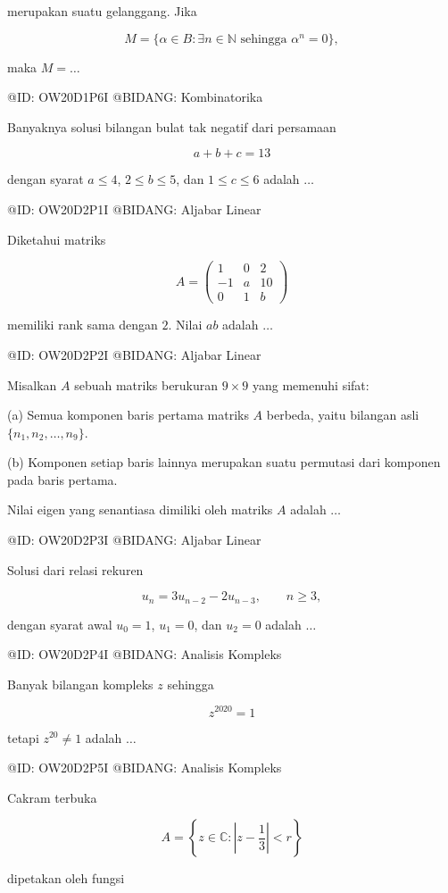 merupakan suatu gelanggang. Jika

$$
M=\{\alpha\in B:\exists n\in\mathbb N\text{ sehingga }\alpha^n=0\},
$$

maka $M=\ldots$

@ID: OW20D1P6I
@BIDANG: Kombinatorika

Banyaknya solusi bilangan bulat tak negatif dari persamaan

$$
a+b+c=13
$$

dengan syarat $a\le4$, $2\le b\le5$, dan $1\le c\le6$ adalah $\ldots$

@ID: OW20D2P1I
@BIDANG: Aljabar Linear

Diketahui matriks

$$
A=
\begin{pmatrix}
1&0&2\\
-1&a&10\\
0&1&b
\end{pmatrix}
$$

memiliki rank sama dengan $2$. Nilai $ab$ adalah $\ldots$

@ID: OW20D2P2I
@BIDANG: Aljabar Linear

Misalkan $A$ sebuah matriks berukuran $9\times9$ yang memenuhi sifat:

(a) Semua komponen baris pertama matriks $A$ berbeda, yaitu bilangan asli $\{n_1,n_2,\ldots,n_9\}$.

(b) Komponen setiap baris lainnya merupakan suatu permutasi dari komponen pada baris pertama.

Nilai eigen yang senantiasa dimiliki oleh matriks $A$ adalah $\ldots$

@ID: OW20D2P3I
@BIDANG: Aljabar Linear

Solusi dari relasi rekuren

$$
u_n=3u_{n-2}-2u_{n-3},\qquad n\ge3,
$$

dengan syarat awal $u_0=1$, $u_1=0$, dan $u_2=0$ adalah $\ldots$

@ID: OW20D2P4I
@BIDANG: Analisis Kompleks

Banyak bilangan kompleks $z$ sehingga

$$
z^{2020}=1
$$

tetapi $z^{20}\ne1$ adalah $\ldots$

@ID: OW20D2P5I
@BIDANG: Analisis Kompleks

Cakram terbuka

$$
A=\left\{z\in\mathbb C:\left|z-\frac13\right|<r\right\}
$$

dipetakan oleh fungsi

